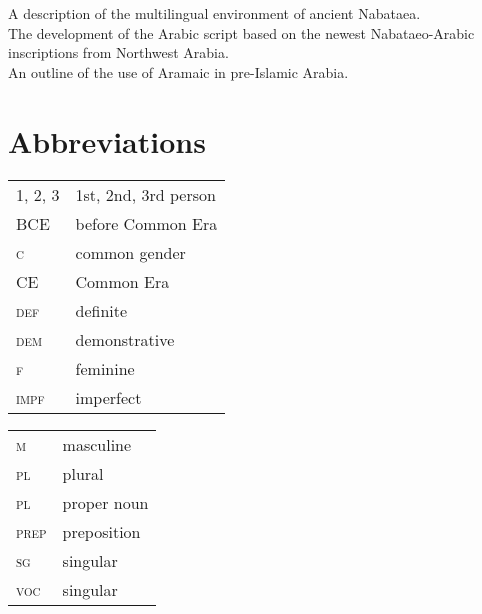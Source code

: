 \documentclass[output=paper]{langsci/langscibook}
\begin{document}
\citet{Macdonald2003} A description of the multilingual environment of ancient Nabataea. \\

\citet{Nehmé2010} The development of the Arabic script based on the newest Nabataeo-Arabic inscriptions from Northwest Arabia.\\

\citet{Stein2018}
An outline of the use of Aramaic in pre-Islamic Arabia.\\

\section*{Abbreviations}

\begin{tabularx}{.45\textwidth}{lQ}
\textsc{1, 2, 3} & 1st, 2nd, 3rd person \\
BCE & before Common Era \\
\textsc{c} & common gender \\
CE & Common Era \\
\textsc{def} & definite \\
\textsc{dem} & demonstrative \\
\textsc{f} & feminine \\
\textsc{impf} & imperfect \\
\end{tabularx}
\begin{tabularx}{.45\textwidth}{lQ}
\textsc{m} & masculine \\
\textsc{pl} & plural \\
\textsc{pl} & proper noun \\
\textsc{prep} & preposition \\
\textsc{sg} & singular \\
\textsc{voc} & singular \\
\end{tabularx}


\sloppy
\printbibliography[heading=subbibliography,notkeyword=this] 
\end{document}
